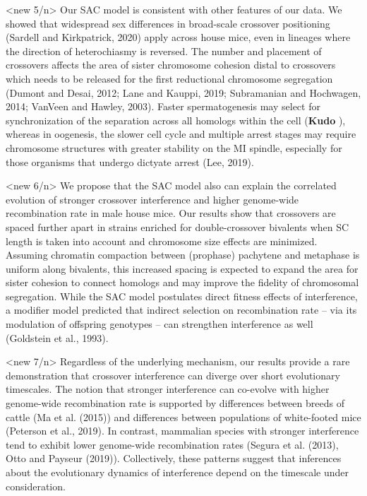 \documentclass[
]{article}
\begin{document}
\textless new 5/n\textgreater{} Our SAC model is consistent with other
features of our data. We showed that widespread sex differences in
broad-scale crossover positioning (Sardell and Kirkpatrick, 2020) apply
across house mice, even in lineages where the direction of heterochiasmy
is reversed. The number and placement of crossovers affects the area of
sister chromosome cohesion distal to crossovers which needs to be
released for the first reductional chromosome segregation (Dumont and
Desai, 2012; Lane and Kauppi, 2019; Subramanian and Hochwagen, 2014;
VanVeen and Hawley, 2003). Faster spermatogenesis may select for
synchronization of the separation across all homologs within the cell
(\textbf{Kudo} ), whereas in oogenesis, the slower cell cycle and
multiple arrest stages may require chromosome structures with greater
stability on the MI spindle, especially for those organisms that undergo
dictyate arrest (Lee, 2019).

\textless new 6/n\textgreater{} We propose that the SAC model also can
explain the correlated evolution of stronger crossover interference and
higher genome-wide recombination rate in male house mice. Our results
show that crossovers are spaced further apart in strains enriched for
double-crossover bivalents when SC length is taken into account and
chromosome size effects are minimized. Assuming chromatin compaction
between (prophase) pachytene and metaphase is uniform along bivalents,
this increased spacing is expected to expand the area for sister
cohesion to connect homologs and may improve the fidelity of chromosomal
segregation. While the SAC model postulates direct fitness effects of
interference, a modifier model predicted that indirect selection on
recombination rate -- via its modulation of offspring genotypes -- can
strengthen interference as well (Goldstein et al., 1993).

\textless new 7/n\textgreater{} Regardless of the underlying mechanism,
our results provide a rare demonstration that crossover interference can
diverge over short evolutionary timescales. The notion that stronger
interference can co-evolve with higher genome-wide recombination rate is
supported by differences between breeds of cattle (Ma et al. (2015)) and
differences between populations of white-footed mice (Peterson et al.,
2019). In contrast, mammalian species with stronger interference tend to
exhibit lower genome-wide recombination rates (Segura et al. (2013),
Otto and Payseur (2019)). Collectively, these patterns suggest that
inferences about the evolutionary dynamics of interference depend on the
timescale under consideration.
\end{document}

